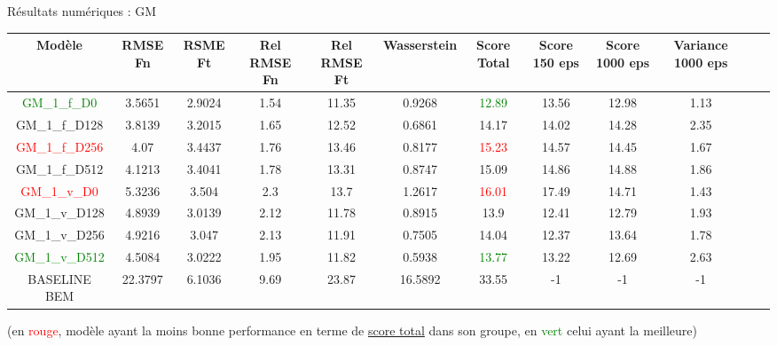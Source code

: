 \documentclass[
11pt,notheorems,hyperref={pdfauthor=whatever}
]{beamer}
\begin{document}
\begin{frame}{Résultats numériques : GM}
        \tiny
        \begin{tabular}{| c | c c c c c c c c c c c | }
        \hline
        Modèle & RMSE Fn & RSME Ft & Rel RMSE Fn & Rel RMSE Ft & Wasserstein & Score Total & Score 150 eps & Score 1000 eps & Variance 1000 eps\\
        \hline
        \textcolor{green}{GM\_1\_f\_D0}	&3.5651	&2.9024	&1.54	&11.35	&0.9268	&\textcolor{green}{12.89}	&13.56	&12.98	&1.13 \\
        GM\_1\_f\_D128	&3.8139	&3.2015	&1.65	&12.52	&0.6861	&14.17	&14.02	&14.28	&2.35 \\
        \textcolor{red}{GM\_1\_f\_D256}	&4.07	&3.4437	&1.76	&13.46	&0.8177	&\textcolor{red}{15.23}	&14.57	&14.45	&1.67	 \\
        GM\_1\_f\_D512	&4.1213	&3.4041	&1.78	&13.31	&0.8747	&15.09	&14.86	&14.88	&1.86 \\
        \hline
        \textcolor{red}{GM\_1\_v\_D0}	&5.3236	&3.504	&2.3	&13.7	&1.2617	&\textcolor{red}{16.01}	&17.49	&14.71	&1.43 \\
        GM\_1\_v\_D128	&4.8939	&3.0139	&2.12	&11.78	&0.8915	&13.9	&12.41	&12.79	&1.93 \\
        GM\_1\_v\_D256	&4.9216	&3.047	&2.13	&11.91	&0.7505	&14.04	&12.37	&13.64	&1.78\\
        \textcolor{green}{GM\_1\_v\_D512}	&4.5084	&3.0222	&1.95	&11.82	&0.5938	&\textcolor{green}{13.77}	&13.22	&12.69	&2.63 \\
        \hline
        BASELINE BEM	&22.3797&6.1036	&9.69	&23.87	&16.5892	&33.55 &-1 &-1 &-1 \\
        \hline
        \end{tabular}

        \vspace{0.3cm}
        
        (en \textcolor{red}{rouge}, modèle ayant la moins bonne performance en terme de \underline{score total} dans son groupe, en \textcolor{green}{vert} celui ayant la meilleure)

    \end{frame}
\end{document}
